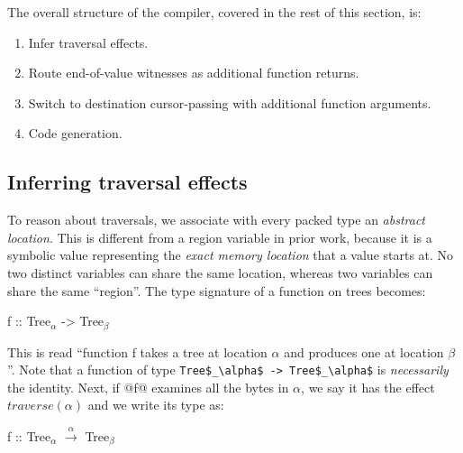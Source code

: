 \documentclass[a4paper,english]{lipics-v2016}
\newcommand{\travarr}[1]{\xrightarrow{#1}}
\newcommand{\arr}[3]{\ensuremath{{#1} \travarr{#2} {#3}}}
\newcommand{\fresh}[1]{\ensuremath{#1}}
\newcommand{\freshA}{\fresh{\alpha}}
\newcommand{\freshB}{\fresh{\beta}}
\begin{document}
The overall structure of the compiler, covered in the rest of this
section, is:
\begin{enumerate}
\item Infer traversal effects.
\item Route end-of-value witnesses as additional function returns.
\item Switch to destination cursor-passing with additional function arguments.
\item Code generation.
\end{enumerate}


\subsection{Inferring traversal effects}

To reason about traversals, we associate with every packed type an {\em abstract
  location}. This is different from a region variable in prior work, because it
is a symbolic value representing the {\em exact memory location} that a value starts
at.  No two distinct variables can share the same location, whereas two
variables can share the same ``region''.  The type signature of a function on
trees becomes:

\begin{code}
f :: Tree$_\alpha$ -> Tree$_\beta$
\end{code}

This is read ``function f takes a tree at location $\alpha$ and produces one at
location $\beta$''.
Note that a function of type \lstinline{Tree$_\alpha$ -> Tree$_\alpha$} is {\em necessarily} the identity.
%
Next, if @f@ examines all the bytes in $\alpha$, we say it has the effect $traverse(\alpha)$
and we write its type as:

\begin{code}
f :: Tree$_\freshA$ $\travarr{\freshA}$ Tree$_\freshB$
\end{code}

\end{document}
